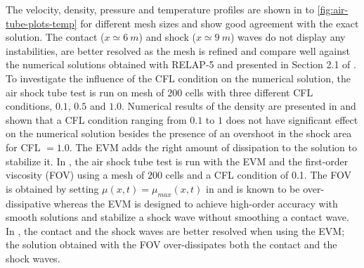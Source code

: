 \documentclass{inputs/mc2015}
\begin{document}
%
The velocity, density, pressure and temperature profiles are shown in  to \ref{fig:air-tube-plots-temp} for different mesh sizes and show good agreement with the exact solution. The contact ($x  \simeq 6 \ m$) and shock ($x  \simeq 9 \ m$) waves do not display any instabilities, are better resolved as the mesh is refined and compare well against the numerical solutions obtained with RELAP-5 and presented in Section 2.1 of \cite{Sokolowski-Koszela}. To investigate the influence of the CFL condition on the numerical solution, the air shock tube test is run on mesh of $200$ cells with three different CFL conditions, $0.1$, $0.5$ and $1.0$. Numerical results of the density are presented in  and shown that a CFL condition ranging from $0.1$ to $1$ does not have significant effect on the numerical solution besides the presence of an overshoot in the shock area for CFL $=1.0$. The EVM adds the right amount of dissipation to the solution to stabilize it. In , the air shock tube test is run with the EVM and the first-order viscosity (FOV) using a mesh of $200$ cells and a CFL condition of 0.1. The FOV is obtained by setting $\mu(x,t) = \mu_{max}(x,t)$ in  and is known to be over-dissipative whereas the EVM is designed to achieve high-order accuracy with smooth solutions and stabilize a shock wave without smoothing a contact wave. In , the contact and the shock waves are better resolved when using the EVM; the solution obtained with the FOV over-dissipates both the contact and the shock waves.
%
\end{document}
